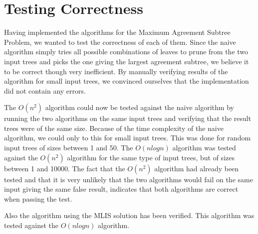 \chapter{Testing Correctness}
Having implemented the algorithms for the Maximum Agreement Subtree Problem, we wanted to test the correctness of each of them. Since the naive algorithm simply tries all possible combinations of leaves to prune from the two input trees and picks the one giving the largest agreement subtree, we believe it to be correct though very inefficient. By manually verifying results of the algorithm for small input trees, we convinced ourselves that the implementation did not contain any errors.

The $O(n^2)$ algorithm could now be tested against the naive algorithm by running the two algorithms on the same input trees and verifying that the result trees were of the same size. Because of the time complexity of the naive algorithm, we could only to this for small input trees. This was done for random input trees of sizes between 1 and 50. The $O(nlogn)$ algorithm was tested against the $O(n^2)$ algorithm for the same type of input trees, but of sizes between 1 and 10000. The fact that the $O(n^2)$ algorithm had already been tested and that it is very unlikely that the two algorithms would fail on the same input giving the same false result, indicates that both algorithms are correct when passing the test.

Also the algorithm using the MLIS solution has been verified. This algorithm was tested against the $O(nlogn)$ algorithm.